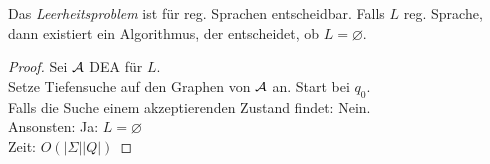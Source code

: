 \begin{Satz}[name={[Leerheitsproblem]}]\label{satz:leerheitsproblem}
	Das \emph{Leerheitsproblem} ist für reg. Sprachen entscheidbar.
	Falls $L$ reg. Sprache, dann existiert ein Algorithmus, der entscheidet, ob $L=\varnothing$.
\end{Satz}
\begin{proof}
	Sei $\mathcal{A}$ \ac{DEA} für $L$.\\
	Setze Tiefensuche auf den Graphen von $\mathcal{A}$ an. Start bei $q_0$.\\
	Falls die Suche einem akzeptierenden Zustand findet: Nein.\\
	Ansonsten: Ja: $L=\varnothing$\\
	Zeit: $O(|\Sigma||Q|)$
\end{proof}

